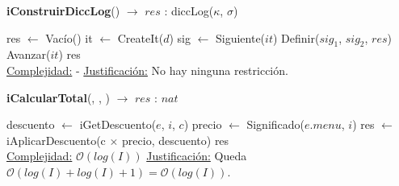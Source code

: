 \begin{Algoritmos}
    \begin{algorithm}
    \caption{\textbf{iConstruirDiccLog}() $\to$ $res$ : diccLog($\kappa$, $\sigma$)}
    \begin{algorithmic}
        \State res $\gets$ Vacío()
        \State it $\gets$ CreateIt($d$)
            \State sig $\gets$ Siguiente($it$)
            \State Definir($sig_1$, $sig_2$, $res$)
            \State Avanzar($it$)
        \EndWhile
        \State \Return res
        \\
        \Statex \underline{Complejidad:} -
        \Statex \underline{Justificación:} No hay ninguna restricción.
    \end{algorithmic}
    \end{algorithm}

    \begin{algorithm}
    \caption{\textbf{iCalcularTotal}(, , ) $\to$ $res$ : $nat$}
        \begin{algorithmic}
        \State descuento $\gets$ iGetDescuento($e$, $i$, $c$)  
        \State precio $\gets$ Significado($e.menu$, $i$)  
        \State res $\gets$ iAplicarDescuento(c $\times$ precio, descuento)  
        \State \Return res
        \\
        \Statex \underline{Complejidad:} $\mathcal{O}(log(I))$
        \Statex \underline{Justificación:} Queda $\mathcal{O}(log(I) + log(I) + 1) = \mathcal{O}(log(I))$.
        \end{algorithmic}
    \end{algorithm}
\end{Algoritmos}